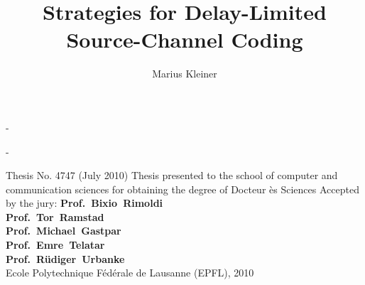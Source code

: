\documentclass[showtrims,booklet]{ipgthesis}
\title{Strategies for Delay-Limited Source-Channel Coding}
\author{}
\date{}
\begin{document}
\trimLmarks
\frontmatter
\begin{titlingpage}
\calccentering{\unitlength}
\begin{adjustwidth*}{\unitlength}{-\unitlength}
\maketitle
\end{adjustwidth*}
\end{titlingpage}

\author{Marius Kleiner}
\renewcommand{\maketitlehookc}
{%
\vskip 11cm
\begin{center}
Ecole Polytechnique F\'ed\'erale de Lausanne (EPFL)
\end{center}
\newpage
}
\begin{titlingpage}
\calccentering{\unitlength}
\begin{adjustwidth*}{\unitlength}{-\unitlength}
\maketitle
\end{adjustwidth*}
{
\noindent Thesis No. 4747 (July 2010)
\vskip 5cm
\noindent
Thesis presented to the school of computer and communication sciences for
obtaining the degree of Docteur \` es Sciences
\vskip 1cm
\noindent Accepted by the jury:
\vskip 0.4cm
\noindent \textbf{Prof.~Bixio~Rimoldi}
\\
\vskip 0.4cm
\noindent\textbf{Prof.~Tor~Ramstad}
\\
\vskip 0.4cm
\noindent\textbf{Prof.~Michael~Gastpar}
\\
\vskip 0.4cm
\noindent \textbf{Prof.~Emre~Telatar}
\\
\vskip 0.4cm
\noindent \textbf{Prof.~R\"udiger~Urbanke}
\\
\vskip 3cm
\noindent Ecole Polytechnique F\'ed\'erale de Lausanne (EPFL), 2010
}\end{titlingpage}



%



\cleardoublepage
\setpnumwidth{1.8em} %
\tableofcontents
\end{document}
